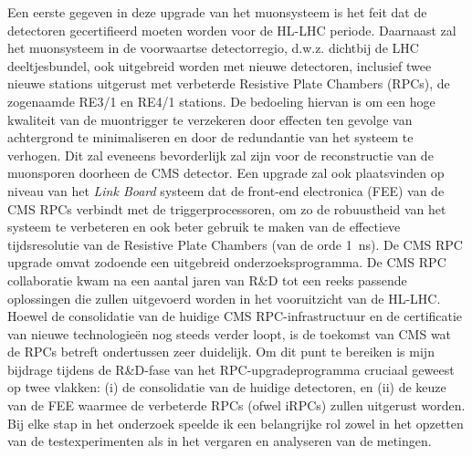 	Een eerste gegeven in deze upgrade van het muonsysteem is het feit dat de detectoren gecertifieerd moeten worden voor de HL-LHC periode. Daarnaast zal het muonsysteem in de voorwaartse detectorregio, d.w.z. dichtbij de LHC deeltjesbundel, ook uitgebreid worden met nieuwe detectoren, inclusief twee nieuwe stations uitgerust met verbeterde Resistive Plate Chambers (RPCs), de zogenaamde RE3/1 en RE4/1 stations. De bedoeling hiervan is om een hoge kwaliteit van de muontrigger te verzekeren door effecten ten gevolge van achtergrond te minimaliseren en door de redundantie van het systeem te verhogen. Dit zal eveneens bevorderlijk zal zijn voor de reconstructie van de muonsporen doorheen de CMS detector. Een upgrade zal ook plaatsvinden op niveau van het {\it Link Board} systeem dat de front-end electronica (FEE) van de CMS RPCs verbindt met de triggerprocessoren, om zo de robuustheid van het systeem te verbeteren en ook beter gebruik te maken van de effectieve tijdsresolutie van de Resistive Plate Chambers (van de orde \SI{1}{ns}). De CMS RPC upgrade omvat zodoende een uitgebreid onderzoeksprogramma. De CMS RPC collaboratie kwam na een aantal jaren van R&D tot een reeks passende oplossingen die zullen uitgevoerd worden in het vooruitzicht van de HL-LHC. Hoewel de consolidatie van de huidige CMS RPC-infrastructuur en de certificatie van nieuwe technologieën nog steeds verder loopt, is de toekomst van CMS wat de RPCs betreft ondertussen zeer duidelijk. Om dit punt te bereiken is mijn bijdrage tijdens de R\&D-fase van het RPC-upgradeprogramma cruciaal geweest op twee vlakken: (i) de consolidatie van de huidige detectoren, en (ii) de keuze van de FEE waarmee de verbeterde RPCs (ofwel iRPCs) zullen uitgerust worden. Bij elke stap in het onderzoek speelde ik een belangrijke rol zowel in het opzetten van de testexperimenten als in het vergaren en analyseren van de metingen.\\
